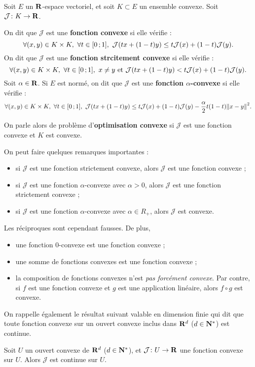 \documentclass[grape]{../ceri/sty/MasterNotes}
\newcommand\J{\mathcal J}
\begin{document}
\begin{defin}
    Soit $E$ un $\mathbf{R}$-espace vectoriel, et soit $K\subset E$ un ensemble convexe. Soit $\J\colon K\to\R$.

    On dit que $\J$ est une \textbf{fonction convexe} si elle vérifie :
    \[ \forall (x,y)\in K\times K,\ \forall t\in\intff 01,\ \J(tx+(1-t)y)\le t\J(x) + (1-t)\J(y). \]
    On dit que $\J$ est une \textbf{fonction strcitement convexe} si elle vérifie :
    \[ \forall (x,y)\in K\times K,\ \forall t\in\intff 01,\ x\ne y\text{ et } \J(tx+(1-t)y)< t\J(x) + (1-t)\J(y). \]
    Soit $\alpha\in\mathbf{R}$. Si $E$ est normé, on dit que $\J$ est une \textbf{fonction $\alpha$-convexe} si elle vérifie :
    \[ \forall (x,y)\in K\times K,\ \forall t\in\intff 01,\ \J(tx+(1-t)y)\le t\J(x) + (1-t)\J(y) - \frac\alpha 2 t(1-t)\norme{x-y}^2. \]
\end{defin}

On parle alors de problème d'\textbf{optimisation convexe} si $\J$ est une fonction convexe et $K$ est convexe.

On peut faire quelques remarques importantes :
\begin{itemize}[wide]
    \item si $\J$ est une fonction strictement convexe, alors $\J$ est une fonction convexe ;
    \item si $\J$ est une fonction $\alpha$-convexe avec $\alpha>0$, alors $\J$ est une fonction strictement convexe ;
    \item si $\J$ est une fonction $\alpha$-convexe avec $\alpha\in R_+$, alors $\J$ est convexe.
\end{itemize}
Les réciproques sont cependant fausses. De plus,
\begin{itemize}
    \item une fonction $0$-convexe est une fonction convexe ;
    \item une somme de fonctions convexes est une fonction convexe ;
    \item la composition de fonctions convexes n'est \textit{pas forcément convexe}. Par contre, si $f$ est une fonction convexe et $g$ est une application linéaire, alors $f\circ g$ est convexe.
\end{itemize}

On rappelle également le résultat suivant valable en dimension finie qui dit que toute fonction convexe sur un ouvert convexe inclus dans $\mathbf{R}^d$ ($d\in\mathbf{N}^*$) est continue.

\begin{theo}\label{th:1.5.3}
    Soit $U$ un ouvert convexe de $\mathbf{R}^d$ ($d\in\mathbf{N}^*$), et $\J\colon U\to\R$ une fonction convexe sur $U$. Alors $\J$ est continue sur $U$.
\end{theo}
\end{document}
